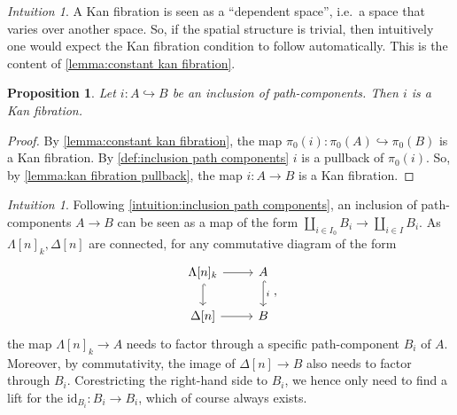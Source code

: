 \documentclass[11pt, a4paper]{amsart}
\newcommand{\id}{\mathrm{id}}
\newtheorem{proposition}[equation]{Proposition}
\theoremstyle{definition}
\theoremstyle{remark}
\newtheorem{intuition}[equation]{Intuition}
\numberwithin{equation}{section}
\begin{document}
\begin{intuition}
  A Kan fibration is seen as a ``dependent space'', i.e.~a space that varies over another space. So, if the spatial structure is trivial, then intuitively one would expect the Kan fibration condition to follow automatically. This is the content of \cref{lemma:constant kan fibration}.
\end{intuition}

\begin{proposition} \label{prop:inclusion path component kan fibration}
  Let $i\colon A \hookrightarrow B$ be an inclusion of path-components. Then $i$ is a Kan fibration.
\end{proposition}

\begin{proof}
 By \cref{lemma:constant kan fibration}, the map $\pi_0(i)\colon \pi_0(A) \hookrightarrow \pi_0(B)$ is a Kan fibration. By \cref{def:inclusion path components} $i$ is a pullback of $\pi_0(i)$. So, by \cref{lemma:kan fibration pullback}, the map $i\colon A \to B$ is a Kan fibration. 
\end{proof}

\begin{intuition}
  Following \cref{intuition:inclusion path components}, an inclusion of path-components $A \to B$ can be seen as a map of the form $\coprod_{i \in I_0} B_i \to \coprod_{i \in I} B_i$. As $\Lambda[n]_k, \Delta[n]$ are connected, for any commutative diagram of the form
  \[  
  \begin{tikzcd}
   \Lambda[n]_k \arrow[r] \arrow[d, hookrightarrow] & A \arrow[d, hookrightarrow, "i"] \\
   \Delta[n] \arrow[r] & B
  \end{tikzcd},
  \]
  the map $\Lambda[n]_k \to A$ needs to factor through a specific path-component $B_i$ of $A$. Moreover, by commutativity, the image of $\Delta[n] \to B$ also needs to factor through $B_i$. Corestricting the right-hand side to $B_i$, we hence only need to find a lift for the $\id_{B_i}\colon B_i \to B_i$, which of course always exists.
\end{intuition}
\end{document}
